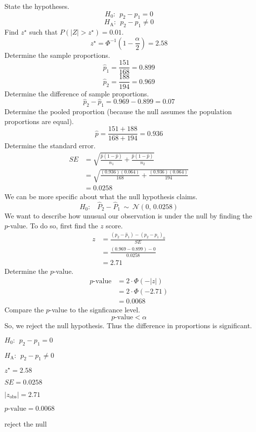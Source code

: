 \begin{solution}
State the hypotheses. \[H_0:~~ p_2-p_1 = 0 \]
\[H_\text{A}: ~~ p_2-p_1 \ne 0 \] Find \(z^\star\) such that
\(P(|Z|>z^\star) = 0.01\).
\[z^\star = \Phi^{-1}\left(1-\frac{\alpha}{2}\right) = 2.58 \] Determine
the sample proportions. \[\hat{p}_1 = \frac{151}{168} = 0.899 \]
\[\hat{p}_2 = \frac{188}{194} = 0.969 \] Determine the difference of
sample proportions. \[\hat{p}_2-\hat{p}_1 = 0.969-0.899 = 0.07 \]
Determine the pooled proportion (because the null assumes the population
proportions are equal). \[ \hat{p} = \frac{151+188}{168+194} = 0.936 \]
Determine the standard error. \[
\begin{aligned}
SE &= \sqrt{\frac{\hat{p}(1-\hat{p})}{n_1}+\frac{\hat{p}(1-\hat{p})}{n_2}} \\[1em]
&= \sqrt{\frac{(0.936)(0.064)}{168}+\frac{(0.936)(0.064)}{194}} \\[1em]
&= 0.0258
\end{aligned}
\] We can be more specific about what the null hypothesis claims.
\[H_0:~~~~ \hat{P}_2-\hat{P}_1 ~\sim~ \mathcal{N}(0,\,0.0258)\] We want
to describe how unusual our observation is under the null by finding the
\(p\)-value. To do so, first find the \(z\) score. \[
\begin{aligned}
z &= \frac{(\hat{p}_2-\hat{p}_1)-(p_2-p_1)_0}{SE}\\
&= \frac{(0.969-0.899)-0}{0.0258} \\
&= 2.71
\end{aligned}
\] Determine the \(p\)-value. \[
\begin{aligned}
p\text{-value} &= 2\cdot \Phi(-|z|)\\
&= 2\cdot \Phi(-2.71)\\
&= 0.0068
\end{aligned}
\] Compare the \(p\)-value to the signficance level.
\[ p\text{-value} < \alpha \] So, we reject the null hypothesis. Thus
the difference in proportions is significant.
\begin{answerlist}
  \item \(H_0: ~~p_2-p_1=0\)
  \item \(H_\text{A}:~~ p_2-p_1\ne 0\)
  \item \(z^\star = 2.58\)
  \item \(SE = 0.0258\)
  \item \(|z_\text{obs}| = 2.71\)
  \item \(p\text{-value} = 0.0068\)
  \item reject the null
\end{answerlist}
\end{solution}

